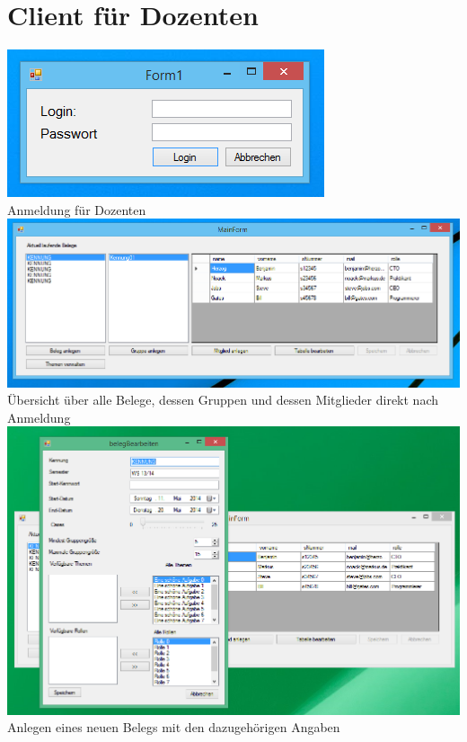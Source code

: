 \documentclass{article}
\begin{document}
\section{Client für Dozenten}
\begin{center}
    \includegraphics{bilder/doz1.PNG}\\
    Anmeldung für Dozenten \\
    
    \includegraphics[scale=0.6]{bilder/doz2.PNG}\\
    Übersicht über alle Belege, dessen Gruppen und dessen Mitglieder direkt nach Anmeldung \\
    
    \includegraphics[scale=0.6]{bilder/doz3.PNG}\\
    Anlegen eines neuen Belegs mit den dazugehörigen Angaben \\
    

\end{center}
\end{document}
